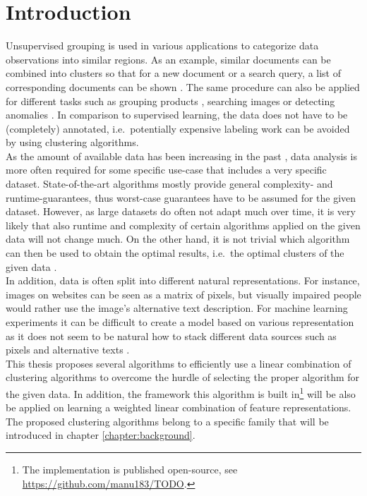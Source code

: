\chapter{Introduction}


Unsupervised grouping is used in various applications to categorize data observations into similar regions. As an example, similar documents can be combined into clusters so that for a new document or a search query, a list of corresponding documents can be shown \cite{zamir1998web}. The same procedure can also be applied for different tasks such as grouping products \cite{balakrishnan2018product}, searching images \cite{lin2018dimensionality} or detecting anomalies \cite{he2003discovering}. In comparison to supervised learning, the data does not have to be (completely) annotated, i.e.\ potentially expensive labeling work can be avoided by using clustering algorithms.\\

As the amount of available data has been increasing in the past \cite{wamba2015big}, data analysis is more often required for some specific use-case that includes a very specific dataset. State-of-the-art algorithms mostly provide general complexity- and runtime-guarantees, thus worst-case guarantees have to be assumed for the given dataset. However, as large datasets do often not adapt much over time, it is very likely that also runtime and complexity of certain algorithms applied on the given data will not change much. On the other hand, it is not trivial which algorithm can then be used to obtain the optimal results, i.e.\ the optimal clusters of the given data \cite{DBLP:journals/corr/GuptaR15b}.\\

In addition, data is often split into different natural representations. For instance, images on websites can be seen as a matrix of pixels, but visually impaired people would rather use the image's alternative text description. For machine learning experiments it can be difficult to create a model based on various representation as it does not seem to be natural how to stack different data sources such as pixels and alternative texts \cite{cebral2018combining}.\\

This thesis proposes several algorithms to efficiently use a linear combination of clustering algorithms to overcome the hurdle of selecting the proper algorithm for the given data. In addition, the framework this algorithm is built in\footnote{The implementation is published open-source, see \url{https://github.com/manu183/TODO}.} will be also be applied on learning a weighted linear combination of feature representations. The proposed clustering algorithms belong to a specific family that will be introduced in chapter \ref{chapter:background}.